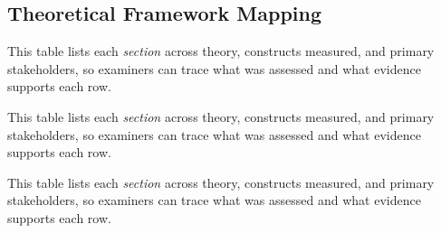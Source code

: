 \subsection{Theoretical Framework Mapping}
\label{subsec:survey_theory}


\noindent This table lists each \textit{section} across theory, constructs measured, and primary stakeholders, so examiners can trace what was assessed and what evidence supports each row.



\noindent This table lists each \textit{section} across theory, constructs measured, and primary stakeholders, so examiners can trace what was assessed and what evidence supports each row.


\noindent This table lists each \textit{section} across theory, constructs measured, and primary stakeholders, so examiners can trace what was assessed and what evidence supports each row.



